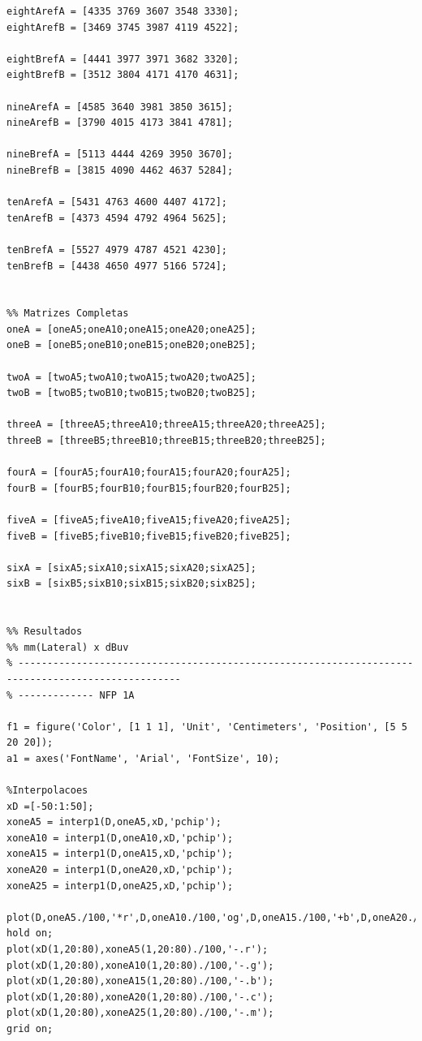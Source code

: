 \begin{lstlisting}
eightArefA = [4335 3769 3607 3548 3330];
eightArefB = [3469 3745 3987 4119 4522];

eightBrefA = [4441 3977 3971 3682 3320];
eightBrefB = [3512 3804 4171 4170 4631];

nineArefA = [4585 3640 3981 3850 3615];
nineArefB = [3790 4015 4173 3841 4781];

nineBrefA = [5113 4444 4269 3950 3670];
nineBrefB = [3815 4090 4462 4637 5284];

tenArefA = [5431 4763 4600 4407 4172];
tenArefB = [4373 4594 4792 4964 5625];

tenBrefA = [5527 4979 4787 4521 4230];
tenBrefB = [4438 4650 4977 5166 5724];


%% Matrizes Completas
oneA = [oneA5;oneA10;oneA15;oneA20;oneA25];
oneB = [oneB5;oneB10;oneB15;oneB20;oneB25];

twoA = [twoA5;twoA10;twoA15;twoA20;twoA25];
twoB = [twoB5;twoB10;twoB15;twoB20;twoB25];

threeA = [threeA5;threeA10;threeA15;threeA20;threeA25];
threeB = [threeB5;threeB10;threeB15;threeB20;threeB25];

fourA = [fourA5;fourA10;fourA15;fourA20;fourA25];
fourB = [fourB5;fourB10;fourB15;fourB20;fourB25];

fiveA = [fiveA5;fiveA10;fiveA15;fiveA20;fiveA25];
fiveB = [fiveB5;fiveB10;fiveB15;fiveB20;fiveB25];

sixA = [sixA5;sixA10;sixA15;sixA20;sixA25];
sixB = [sixB5;sixB10;sixB15;sixB20;sixB25];


%% Resultados
%% mm(Lateral) x dBuv
% --------------------------------------------------------------------------------------------------
% ------------- NFP 1A

f1 = figure('Color', [1 1 1], 'Unit', 'Centimeters', 'Position', [5 5 20 20]);
a1 = axes('FontName', 'Arial', 'FontSize', 10);

%Interpolacoes
xD =[-50:1:50];
xoneA5 = interp1(D,oneA5,xD,'pchip');
xoneA10 = interp1(D,oneA10,xD,'pchip');
xoneA15 = interp1(D,oneA15,xD,'pchip');
xoneA20 = interp1(D,oneA20,xD,'pchip');
xoneA25 = interp1(D,oneA25,xD,'pchip');

plot(D,oneA5./100,'*r',D,oneA10./100,'og',D,oneA15./100,'+b',D,oneA20./100,'xc',D,oneA25./100,'pm');
hold on;
plot(xD(1,20:80),xoneA5(1,20:80)./100,'-.r');
plot(xD(1,20:80),xoneA10(1,20:80)./100,'-.g');
plot(xD(1,20:80),xoneA15(1,20:80)./100,'-.b');
plot(xD(1,20:80),xoneA20(1,20:80)./100,'-.c');
plot(xD(1,20:80),xoneA25(1,20:80)./100,'-.m');
grid on;


\end{lstlisting}
